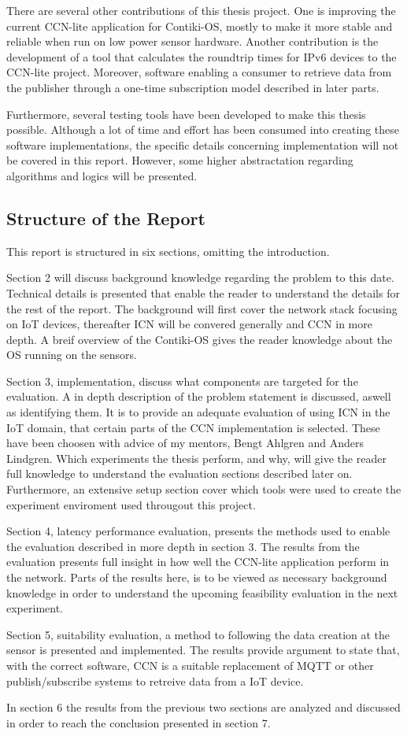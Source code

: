 There are several other contributions of this thesis project. One is improving the current CCN-lite application for Contiki-OS, mostly to make it more stable and reliable when run on low power sensor hardware. Another contribution is the development of a tool that calculates the roundtrip times for IPv6 devices to the CCN-lite project. Moreover, software enabling a consumer to retrieve data from the publisher through a one-time subscription model described in later parts.

Furthermore, several testing tools have been developed to make this thesis possible. Although a lot of time and effort has been consumed into creating these software implementations, the specific details concerning implementation will not be covered in this report. However, some higher abstractation regarding algorithms and logics will be presented.




\subsection{Structure of the Report}
This report is structured in six sections, omitting the introduction.

Section 2 will discuss background knowledge regarding the problem to this date. Technical details is presented that enable the reader to understand the details for the rest of the report. The background will first cover the network stack focusing on IoT devices, thereafter ICN will be convered generally and CCN in more depth. A breif overview of the Contiki-OS gives the reader knowledge about the OS running on the sensors.

Section 3, implementation, discuss what components are targeted for the evaluation. A in depth description of the problem statement is discussed, aswell as identifying them. It is to provide an adequate evaluation of using ICN in the IoT domain, that certain parts of the CCN implementation is selected. These have been choosen with advice of my mentors, Bengt Ahlgren and Anders Lindgren. Which experiments the thesis perform, and why, will give the reader full knowledge to understand the evaluation sections described later on. Furthermore, an extensive setup section cover which tools were used to create the experiment enviroment used througout this project.

Section 4, latency performance evaluation, presents the methods used to enable the evaluation described in more depth in section 3. The results from the evaluation presents full insight in how well the CCN-lite application perform in the network. Parts of the results here, is to be viewed as necessary background knowledge in order to understand the upcoming feasibility evaluation in the next experiment.

Section 5, suitability evaluation, a method to following the data creation at the sensor is presented and implemented. The results provide argument to state that, with the correct software, CCN is a suitable replacement of MQTT or other publish/subscribe systems to retreive data from a IoT device. 

In section 6 the results from the previous two sections are analyzed and discussed in order to reach the conclusion presented in section 7.